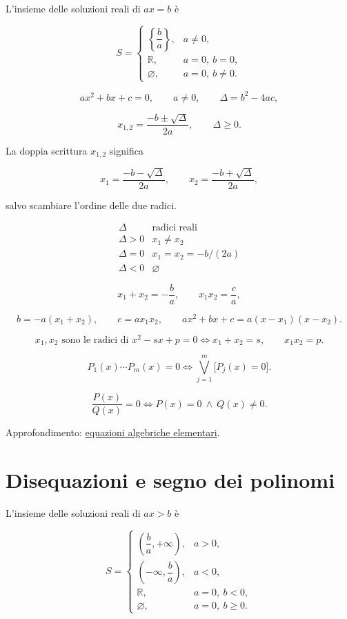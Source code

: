L'insieme delle soluzioni reali di \(ax=b\) è

\[
S=
\begin{cases}
\left\{\dfrac ba\right\},&a\ne0,\\[6pt]
\mathbb R,&a=0,\ b=0,\\
\varnothing,&a=0,\ b\ne0.
\end{cases}
\]

\[
ax^2+bx+c=0,
\qquad
a\ne0,
\qquad
\Delta=b^2-4ac,
\]

\[
x_{1,2}=\frac{-b\pm\sqrt\Delta}{2a},
\qquad
\Delta\ge0.
\]

La doppia scrittura \(x_{1,2}\) significa

\[
x_1=\frac{-b-\sqrt\Delta}{2a},
\qquad
x_2=\frac{-b+\sqrt\Delta}{2a},
\]

salvo scambiare l'ordine delle due radici.

\[
\begin{array}{c|c}
\Delta&\text{radici reali}\\
\hline
\Delta>0&x_1\ne x_2\\
\Delta=0&x_1=x_2=-b/(2a)\\
\Delta<0&\varnothing
\end{array}
\]

\[
x_1+x_2=-\frac ba,
\qquad
x_1x_2=\frac ca,
\]

\[
b=-a(x_1+x_2),
\qquad
c=ax_1x_2,
\qquad
ax^2+bx+c=a(x-x_1)(x-x_2).
\]

\[
x_1,x_2\text{ sono le radici di }x^2-sx+p=0
\Longleftrightarrow
x_1+x_2=s,
\qquad
x_1x_2=p.
\]

\[
P_1(x)\cdots P_m(x)=0
\Longleftrightarrow
\bigvee_{j=1}^m\bigl[P_j(x)=0\bigr].
\]

\[
\frac{P(x)}{Q(x)}=0
\Longleftrightarrow
P(x)=0\ \land\ Q(x)\ne0.
\]

Approfondimento: \href{https://ingegnerismo.it/matematica/equazioni-algebriche-elementari/}{equazioni algebriche elementari}.

\section{Disequazioni e segno dei polinomi}\label{disequazioni-e-segno-dei-polinomi}

L'insieme delle soluzioni reali di \(ax>b\) è

\[
S=
\begin{cases}
\left(\dfrac ba,+\infty\right),&a>0,\\[6pt]
\left(-\infty,\dfrac ba\right),&a<0,\\[6pt]
\mathbb R,&a=0,\ b<0,\\
\varnothing,&a=0,\ b\ge0.
\end{cases}
\]

